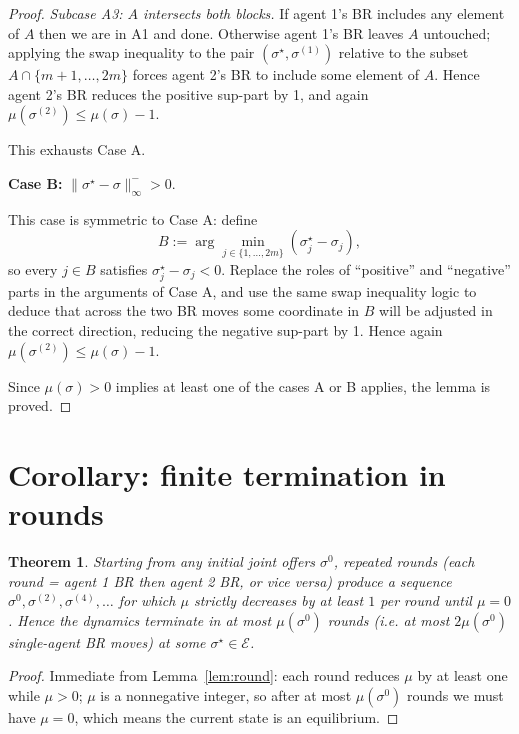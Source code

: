\documentclass[11pt]{article}
\newtheorem{theorem}[lemma]{Theorem}
\begin{document}
\begin{proof}
\smallskip\noindent\emph{Subcase A3: \(A\) intersects both blocks.}
If agent 1's BR includes any element of \(A\) then we are in A1 and
done. Otherwise agent 1's BR leaves \(A\) untouched; applying the swap
inequality to the pair \((\sigma^\star,\sigma^{(1)})\) relative to the
subset \(A\cap\{m+1,\dots,2m\}\) forces agent 2's BR to include some
element of \(A\). Hence agent 2's BR reduces the positive sup-part by 1,
and again \(\mu(\sigma^{(2)})\le\mu(\sigma)-1\).

This exhausts Case A.

\medskip\noindent\textbf{Case B:} \(\|\sigma^\star-\sigma\|_\infty^->0\).

This case is symmetric to Case A: define
\[
B := \arg\min_{j\in\{1,\dots,2m\}} (\sigma^\star_j-\sigma_j),
\]
so every \(j\in B\) satisfies \(\sigma^\star_j-\sigma_j<0\). Replace
the roles of ``positive'' and ``negative'' parts in the arguments of
Case A, and use the same swap inequality logic to deduce that across
the two BR moves some coordinate in \(B\) will be adjusted in the
correct direction, reducing the negative sup-part by 1. Hence again
\(\mu(\sigma^{(2)})\le\mu(\sigma)-1\).

\medskip

Since \(\mu(\sigma)>0\) implies at least one of the cases A or B
applies, the lemma is proved.
\end{proof}

\section{Corollary: finite termination in rounds}

\begin{theorem}
Starting from any initial joint offers \(\sigma^0\), repeated rounds
(each round = agent 1 BR then agent 2 BR, or vice versa) produce a
sequence \(\sigma^0,\sigma^{(2)},\sigma^{(4)},\dots\) for which
\(\mu\) strictly decreases by at least \(1\) per round until \(\mu=0\).
Hence the dynamics terminate in at most \(\mu(\sigma^0)\) rounds
(i.e. at most \(2\mu(\sigma^0)\) single-agent BR moves) at some
\(\sigma^\star\in\mathcal E\).
\end{theorem}

\begin{proof}
Immediate from Lemma~\ref{lem:round}: each round reduces \(\mu\) by
at least one while \(\mu>0\); \(\mu\) is a nonnegative integer, so
after at most \(\mu(\sigma^0)\) rounds we must have \(\mu=0\), which
means the current state is an equilibrium.
\end{proof}
\end{document}
